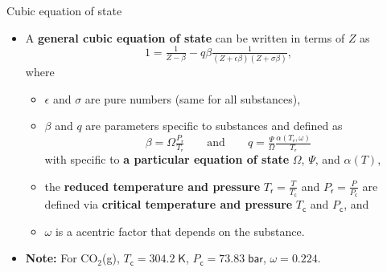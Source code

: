 \begin{frame}{Cubic equation of state}

\begin{itemize}
\item A \alert{\textbf{general cubic equation of state}} can be written in terms
of $Z$ \citep{Smith2005} as
\[
\boxed{1=\tfrac{1}{Z-\beta}-q\beta\tfrac{1}{(Z+\epsilon\beta)(Z+\sigma\beta)}},
\]
where  
\begin{itemize}
\item $\epsilon$ and $\sigma$ are pure numbers (same for all substances),  
\item $\beta$ and $q$ are  parameters specific to substances and defined as
\[
\beta=\Omega\tfrac{P_{\mathsf{r}}}{T_{\mathsf{r}}} \qquad \mbox{and} \qquad
q=\tfrac{\Psi}{\Omega}\tfrac{\alpha(T_{\mathsf{r}},\omega)}{T_{\mathsf{r}}}
\]
%
with specific to \textbf{a particular equation of state} $\Omega$, $\Psi$, and $\alpha(T)$, 
\item the \textbf{reduced temperature and pressure} $T_{\mathsf{r}} = \tfrac{T}{T_{\mathsf{c}}}$ and
$P_{\mathsf{r}} = \tfrac{P}{P_{\mathsf{c}}}$ are defined via \textbf{critical temperature and pressure} 
$T_{\mathsf{c}}$ and $P_{\mathsf{c}}$, and 
\item $\omega$ is a \alert{acentric factor} that depends on the substance.
\end{itemize}
%
\item \textbf{Note:} For CO$_{2}$(g), ${T_{\mathsf{c}}=304.2\;\mathsf{K}}$, ${P_{\mathsf{c}}=73.83\;\mathsf{bar}}$,
${\omega=0.224}$. 
\end{itemize}

\end{frame}
%
